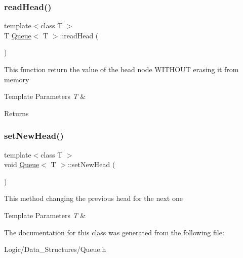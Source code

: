 \subsubsection{\texorpdfstring{readHead()}{readHead()}}
{\footnotesize\ttfamily template$<$class T $>$ \\
T \mbox{\hyperlink{class_queue}{Queue}}$<$ T $>$\+::read\+Head (\begin{DoxyParamCaption}{ }\end{DoxyParamCaption})}

This function return the value of the head node W\+I\+T\+H\+O\+UT erasing it from memory 
\begin{DoxyTemplParams}{Template Parameters}
{\em T} & \\
\hline
\end{DoxyTemplParams}
\begin{DoxyReturn}{Returns}

\end{DoxyReturn}
\mbox{\label{class_queue_accadcc0fafa61d585ea8a5d8d0e276a7}} 
\subsubsection{\texorpdfstring{setNewHead()}{setNewHead()}}
{\footnotesize\ttfamily template$<$class T $>$ \\
void \mbox{\hyperlink{class_queue}{Queue}}$<$ T $>$\+::set\+New\+Head (\begin{DoxyParamCaption}{ }\end{DoxyParamCaption})}

This method changing the previous head for the next one 
\begin{DoxyTemplParams}{Template Parameters}
{\em T} & \\
\hline
\end{DoxyTemplParams}


The documentation for this class was generated from the following file\+:\begin{DoxyCompactItemize}
\item 
Logic/\+Data\+\_\+\+Structures/Queue.\+h\end{DoxyCompactItemize}
